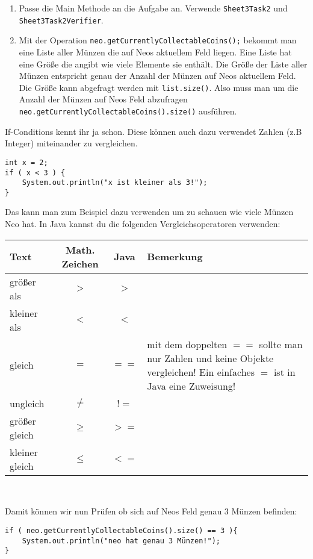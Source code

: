 
\begin{enumerate}
	\item
		Passe die Main Methode an die Aufgabe an. 
		Verwende \lstinline{Sheet3Task2} und \lstinline{Sheet3Task2Verifier}.

	\item
		Mit der Operation \lstinline{neo.getCurrentlyCollectableCoins();} bekommt man eine Liste aller Münzen die auf Neos aktuellem Feld liegen. 
		Eine Liste hat eine Größe die angibt wie viele Elemente sie enthält. 
		Die Größe der Liste aller Münzen entspricht genau der Anzahl der Münzen auf Neos aktuellem Feld. 
		Die Größe kann abgefragt werden mit \lstinline{list.size()}. 
		Also muss man um die Anzahl der Münzen auf Neos Feld abzufragen \lstinline{neo.getCurrentlyCollectableCoins().size()} ausführen.
\end{enumerate}


\begin{Infobox}[If-Conditions 2]

	If-Conditions kennt ihr ja schon. 
	Diese können auch dazu verwendet Zahlen (z.B Integer) miteinander zu vergleichen.

	\begin{lstlisting}
int x = 2;
if ( x < 3 ) {
	System.out.println("x ist kleiner als 3!");
}
	\end{lstlisting}

	Das kann man zum Beispiel dazu verwenden um zu schauen wie viele Münzen Neo hat. 
	In Java kannst du die folgenden Vergleichsoperatoren verwenden:

	\begin{center}
		\begin{tabular}{ l | c | c | l }
			Text & Math. Zeichen & Java & Bemerkung\\ \hline
			größer als & $>$ & $>$ & \\
			kleiner als & $<$ & $<$ & \\
			gleich & $=$ & $==$ & \minibox{
					mit dem doppelten $==$ sollte man nur \\ 
					Zahlen und keine Objekte vergleichen!\\ 
					Ein einfaches $=$ ist in Java eine Zuweisung!
			}\\

			ungleich & $\neq$ & $!=$ & \\
			größer gleich & $\geq$ & $>=$ &  \\
			kleiner gleich & $\leq$ & $<=$ &  \\
        \end{tabular} \\
	\end{center}

	Damit können wir nun Prüfen ob sich auf Neos Feld genau 3 Münzen befinden:

	\begin{lstlisting}
if ( neo.getCurrentlyCollectableCoins().size() == 3 ){
	System.out.println("neo hat genau 3 Münzen!");
}
	\end{lstlisting}
\end{Infobox}



